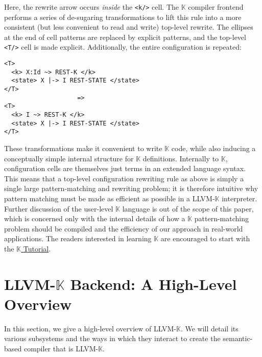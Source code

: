 \documentclass{article}
\theoremstyle{definition}
\newcommand{\K}{$\mathbb{K}$\xspace}
\newcommand{\KL}{LLVM-\K}
\newcommand{\kcode}[1]{\texttt{#1}}
\newcommand{\cell}[1]{\kcode{<#1/>}}
\begin{document}
Here, the rewrite arrow occurs \emph{inside} the \cell{k} cell. The \K compiler
frontend performs a series of de-sugaring transformations to lift this rule into
a more consistent (but less convenient to read and write) top-level rewrite. The
ellipses at the end of cell patterns are replaced by explicit patterns, and the
top-level \cell{T} cell is made explicit. Additionally, the entire configuration
is repeated:
\begin{lstlisting}[language=K,numbers=none,frame=none,basicstyle=\footnotesize]
<T>                                        
  <k> X:Id ~> REST-K </k>
  <state> X |-> I REST-STATE </state>
</T>                                       
                    =>
<T>                                        
  <k> I ~> REST-K </k>
  <state> X |-> I REST-STATE </state>
</T>                                       
\end{lstlisting}

These transformations make it convenient to write \K code, while also inducing a
conceptually simple internal structure for \K definitions. Internally to \K,
configuration cells are themselves just terms in an extended language syntax.
This means that a top-level configuration rewriting rule as above is simply a
single large pattern-matching and rewriting problem; it is therefore intuitive
why pattern matching must be made as efficient as possible in a \KL interpreter.
Further discussion of the user-level \K language is out of the scope of this
paper, which is concerned only with the internal details of how a \K
pattern-matching problem should be compiled and the efficiency of our approach in real-world applications.  The readers interested in learning \K are encouraged to start with the \href{https://kframework.org}{\K Tutorial}.




















\section{\KL Backend: A High-Level Overview} \label{sec:overview}
In this section, we give a high-level overview of \KL. We will detail its various subsystems and the ways in which they interact to create the semantic-based compiler that is \KL.
\end{document}
